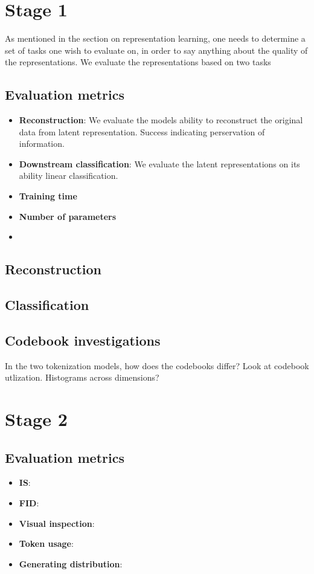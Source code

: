\documentclass[../../thesis.tex]{subfiles}
\begin{document}
\section{Stage 1}

As mentioned in the section on representation learning, one needs to determine a set of tasks one wish to evaluate on, in order to say anything about the quality of the representations. We evaluate the representations based on two tasks

\subsection{Evaluation metrics}

\begin{itemize}
    \item \textbf{Reconstruction}: We evaluate the models ability to reconstruct the original data from latent representation. Success indicating perservation of information.
    \item \textbf{Downstream classification}: We evaluate the latent representations on its ability  linear classification. 
    \item \textbf{Training time}
    \item \textbf{Number of parameters}
    \item 
\end{itemize}

\subsection{Reconstruction}

\subsection{Classification}

\subsection{Codebook investigations}

In the two tokenization models, how does the codebooks differ? Look at codebook utlization. Histograms across dimensions?  

\section{Stage 2}

\subsection{Evaluation metrics}
\begin{itemize}
    \item \textbf{IS}:
    \item \textbf{FID}:
    \item \textbf{Visual inspection}:
    \item \textbf{Token usage}:
    \item \textbf{Generating distribution}:
\end{itemize}
\end{document}
